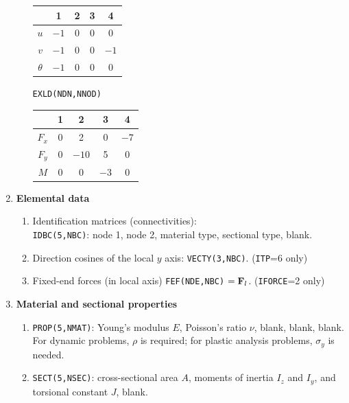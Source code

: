 \begin{enumerate}[leftmargin=*]
\begin{enumerate}[label=(\alph*)]
\begin{center}
\begin{minipage}{0.47\linewidth}
            \begin{tabular}{|c|c|c|c|c|}\hline
                       & 1    & 2 & 3 & 4   \\\hline
              $u$      & $-1$ & 0 & 0 & 0   \\\hline
              $v$      & $-1$ & 0 & 0 & $-1$\\\hline
              $\theta$ & $-1$ & 0 & 0 & 0   \\\hline
            \end{tabular}
          \end{minipage}
          \begin{minipage}{0.5\linewidth}\centering
            \texttt{EXLD(NDN,NNOD)}\\[4pt]
            \begin{tabular}{|c|c|c|c|c|}\hline
                    & 1 & 2     & 3    & 4   \\\hline
              $F_x$ & 0 & 2     & 0    & $-7$\\\hline
              $F_y$ & 0 & $-10$ & 5    & 0   \\\hline
              $M$   & 0 & 0     & $-3$ & 0   \\\hline
            \end{tabular}
          \end{minipage}
        \end{center}
    \end{enumerate}

  \item \textbf{Elemental data}
    \begin{enumerate}[label=(\alph*)]
      \item Identification matrices (connectivities):\\
        \texttt{IDBC(5,NBC)}: node 1, node 2, material type, sectional type, blank.
      \item Direction cosines of the local $y$ axis: \texttt{VECTY(3,NBC)}. (\texttt{ITP}=6 only)
        \begin{fig}
          
        \end{fig}
      \item Fixed-end forces (in local axis) \texttt{FEF(NDE,NBC)} $= \mathbf{F}_l$. (\texttt{IFORCE}=2 only)
    \end{enumerate}

  \item \textbf{Material and sectional properties}
    \begin{enumerate}[label=(\alph*)]
      \item \texttt{PROP(5,NMAT)}: Young's modulus $E$, Poisson's ratio $\nu$, blank, blank, blank.\\
        For dynamic problems, $\rho$ is required; for plastic analysis problems, $\sigma_y$ is needed.
      \item \texttt{SECT(5,NSEC)}: cross-sectional area $A$, moments of inertia $I_z$ and $I_y$, and torsional constant $J$, blank.
    \end{enumerate}
\end{enumerate}

